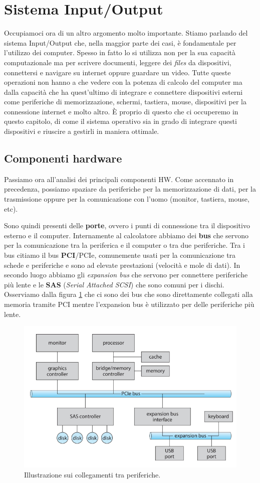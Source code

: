 \pagebreak
\section{Sistema Input/Output}
Occupiamoci ora di un altro argomento molto importante. Stiamo parlando del sistema Input/Output che, nella maggior parte dei casi, è fondamentale per l'utilizzo dei computer. Spesso in fatto lo si utilizza non per la sua capacità computazionale ma per scrivere documenti, leggere dei \textit{files} da dispositivi, connettersi e navigare su internet oppure guardare un video. Tutte queste operazioni non hanno a che vedere con la potenza di calcolo del computer ma dalla capacità che ha quest'ultimo di integrare e connettere dispositivi esterni come periferiche di memorizzazione, schermi, tastiera, mouse, dispositivi per la connessione internet e molto altro. È proprio di questo che ci occuperemo in questo capitolo, di come il sistema operativo sia in grado di integrare questi dispositivi e riuscire a gestirli in maniera ottimale.

\subsection{Componenti hardware}
Passiamo ora all'analisi dei principali componenti HW. Come accennato in precedenza, possiamo spaziare da periferiche per la memorizzazione di dati, per la trasmissione oppure per la comunicazione con l'uomo (monitor, tastiera, mouse, etc).

Sono quindi presenti delle \textbf{porte}, ovvero i punti di connessione tra il dispositivo esterno e il computer. Internamente al calcolatore abbiamo dei \textbf{bus} che servono per la comunicazione tra la periferica e il computer o tra due periferiche. Tra i bus citiamo il bus \textbf{PCI}/PCIe, comunemente usati per la comunicazione tra schede e periferiche e sono ad elevate prestazioni (velocità e mole di dati). In secondo luogo abbiamo gli \textit{expansion bus} che servono per connettere periferiche più lente e le \textbf{SAS} (\textit{Serial Attached SCSI}) che sono comuni per i dischi. Osserviamo dalla figura \ref{fig:busses} che ci sono dei bus che sono direttamente collegati alla memoria tramite PCI mentre l'expansion bus è utilizzato per delle periferiche più lente.
\begin{figure}[h]
    \centering
    \includegraphics[width = .6\textwidth]{../res/imgs/IO system/busses.png}
    \caption{Illustrazione sui collegamenti tra periferiche.}
    \label{fig:busses}
\end{figure}

